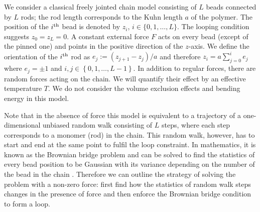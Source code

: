 \documentclass[aps,showpacs,twocolumn,floatfix,prx,superscriptaddress]{revtex4-1}
\begin{document}
We consider a classical freely jointed chain model \cite{Doi1988} consisting of $L$ beads connected by $L$ rods; the rod length corresponds to the Kuhn length $a$ of the polymer. The position of the $i^{\rm th}$ bead is denoted by $z_i$, $i\in\{0,1, \ldots,L\}$. The looping condition suggests $z_0=z_L=0$. A constant external force $F$ acts on every bead (except of the pinned one) and points in the positive direction of the $z$-axis.  We define the orientation of the $i^{\rm th}$ rod as $e_j:=(z_{j+1} - z_{j})/a$ and therefore $z_i = a\sum_{j=0}^{i} e_j$ where $e_j=\pm 1$ and $i,j \in \left\{0, 1, \ldots, L-1\right\}$. In addition to regular forces, there are random forces acting on the chain. We will quantify their effect by an effective temperature $T$. We do not consider the volume exclusion effects and bending energy in this model.

Note that in the absence of force this model is equivalent to a trajectory of a one-dimensional unbiased random walk \cite{Lawler2010} consisting of $L$ steps, where each step corresponds to a monomer (rod) in the chain. This random walk, however, has to start and end at the same point to fulfil the loop constraint. In mathematics, it is known as the Brownian bridge problem and can be solved to find the statistics of every bead position to be Gaussian with its variance depending on the number of the bead in the chain \cite{Lin2015}. Therefore we can outline the strategy of solving the problem with a non-zero force: first find how the statistics of random walk steps changes in the presence of force and then enforce the Brownian bridge condition to form a loop. 
\end{document}
